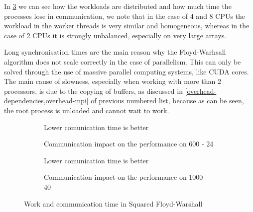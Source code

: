In \cref{work-and-communication-time} we can see how the workloads are distributed and how much time the processes lose in communication, we note that in the case of 4 and 8 CPUs the workload in the worker threads is very similar and homogeneous, whereas in the case of 2 CPUs it is strongly unbalanced, especially on very large arrays.

Long synchronisation times are the main reason why the Floyd-Warhsall algorithm does not scale correctly in the case of parallelism. This can only be solved through the use of massive parallel computing systems, like CUDA cores.
The main cause of slowness, especially when working with more than 2 processors, is due to the copying of buffers, as discussed in \cref{overhead-dependencies,overhead-mpi} of previous numbered list, because as can be seen, the root process is unloaded and cannot wait to work.

\begin{figure}[htbp]
    \datatable
    \begin{subfigure}[t]{0.5\textwidth}
                
        \caption*{Lower comunication time is better}
        \caption{Communication impact on the performance on 600 - 24}
        \label{commimpact600_24}
    \end{subfigure}
    \datatable
    \begin{subfigure}[t]{0.5\textwidth}
        
        \caption*{Lower comunication time is better}
        \caption{Communication impact on the performance on 1000 - 40}
        \label{commimpact1000_40}
    \end{subfigure}

    \caption{Work and communication time in Squared Floyd-Warshall}
    \label{work-and-communication-time}
\end{figure}

